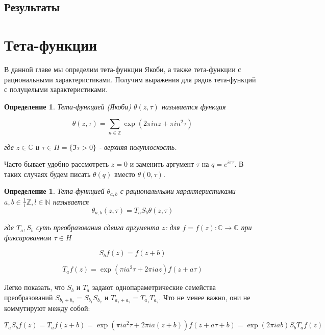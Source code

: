 \documentclass{article}
\newcommand{\ZZ}{\mathbb{Z}}
\newcommand{\CC}{\mathbb{C}}
\newcommand{\NN}{\mathbb{N}}
\theoremstyle{break}
\newtheorem{definition}[theorem]{Определение}
\begin{document}
\subsection{Результаты}

\section{Тета-функции}
В данной главе мы определим тета-функции Якоби, а также тета-функции с рациональными характеристиками. Получим выражения для рядов тета-функций с полуцелыми характеристиками.
\begin{definition}
	Тета-функцией (Якоби) $\theta(z, \tau)$ называется функция
	
	\begin{equation}
	\theta(z,\tau)=\sum_{n \in \ZZ} \exp(2 \pi inz + \pi i n^2 \tau)
	\end{equation}
	
	
	где $z \in \CC$ и $\tau \in H=\{\Im \tau > 0\}$ - верхняя полуплоскость.
\end{definition}

Часто бывает удобно рассмотреть $z=0$ и заменить аргумент $\tau$ на $q=e^{i \pi \tau}$. 
В таких случаях будем писать $\theta(q)$ вместо $\theta(0, \tau)$.

\begin{definition}
Тета-функцией $\theta_{a, b}$ с рациональными характеристиками $a, b \in  \frac{1}{l}\ZZ, l \in \NN$ называется
\begin{equation}
	\theta_{a, b}(z, \tau)=T_aS_b\theta(z, \tau)
\end{equation}

где $T_a, S_b$ суть преобразования сдвига аргумента $z$: для $f=f(z): \CC \to \CC$ при фиксированном $\tau \in H$
\end{definition}
\begin{equation}
	S_b f(z)=f(z+b)
\end{equation}

\begin{equation}
	T_a f(z)=\exp{(\pi i a^2 \tau + 2 \pi i a z)}f(z + a\tau)
\end{equation}

Легко показать, что $S_b$ и $T_a$ задают однопараметрические семейства преобразований $S_{b_1 + b_2}=S_{b_1}S_{b_2}$ и $T_{a_1+a_2}=T_{a_1}T_{a_2}$. 
Что не менее важно, они не коммутируют между собой: 

\begin{equation}
T_a S_b f(z)=T_a f(z + b) = \exp{(\pi i a^2 \tau + 2 \pi i a (z + b))} f(z + a\tau + b) = \exp{(2 \pi i a b)} S_b T_a f(z)
\end{equation}
\end{document}
